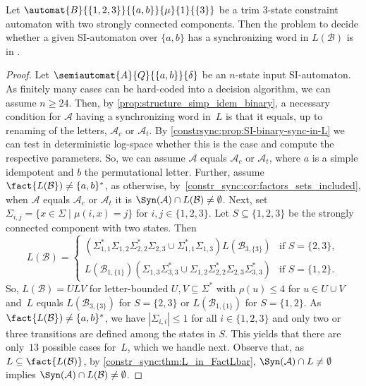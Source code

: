 \begin{lemma}\label{constrsync:input:SI:lem:threestates}
	Let $\automat{B}{\{1,2,3\}}{\{a,b\}}{\mu}{1}{\{3\}}$
	be a trim $3$-state constraint automaton
	with two strongly connected components.
	Then the problem to decide
	whether a given SI-automaton over $\{a,b\}$
	has a synchronizing word in $L(\mathcal B)$ is in \LOGSPACE.
\end{lemma}
\begin{proof}
	Let $\semiautomat{A}{Q}{\{a,b\}}{\delta}$
	be an $n$-state input SI-automaton.  
	As finitely many cases can be hard-coded into a decision algorithm, we can 
	assume $n \ge 24$.  	
	Then, by \cref{prop:structure_simp_idem_binary}, 
	a necessary condition for $\mathcal A$
	having a synchronizing word in~$L$
	is that it equals, up to renaming of the letters,
	$\mathcal A_c$
	or $\mathcal A_t$.
	By \cref{constrsync:prop:SI-binary-sync-in-L}
	we can test in deterministic log-space whether this is the case
    and compute the respective parameters.
    So, we can assume 
    $\mathcal A$ equals $\mathcal A_c$ or $\mathcal A_t$,
    where $a$ is a simple idempotent and $b$
    the permutational letter.
    Further, assume 
    $\fact{L(\mathcal B}) \ne \{a,b\}^*$,
    as otherwise, by~\cref{constr_sync:cor:factors_sets_included},
    when $\mathcal A$ equals $\mathcal A_c$
    or $\mathcal A_t$ it is $\Syn(\mathcal A) \cap L(\mathcal B) \ne \emptyset$.    
	Next, set $\Sigma_{i,j} = \{ x \in \Sigma \mid \mu(i, x) = j \}$
	for $i,j \in \{1,2,3\}$.
	Let $S \subseteq \{1,2,3\}$
	be the strongly connected component with two states.
	Then 
	\begin{equation}\label{constrsync:SI:eqn:threestates}
		L(\mathcal B) = \begin{cases}
			( \Sigma_{1,1}^* \Sigma_{1,2} \Sigma_{2,2}^* \Sigma_{2,3} \cup \Sigma_{1,1}^* \Sigma_{1,3} ) L(\mathcal B_{3,\{3\}}) & \text{if } S = \{2,3\}, \\
			L(\mathcal B_{1,\{1\}}) ( \Sigma_{1,3}\Sigma_{3,3}^* \cup \Sigma_{1,2}\Sigma_{2,2}^* \Sigma_{2,3} \Sigma_{3,3}^*) & \text{if } S = \{1,2\}.
		\end{cases}
	\end{equation}
    So, $L(\mathcal B) = ULV$ for letter-bounded $U, V \subseteq \Sigma^*$
    with $\rho(u) \le 4$ for $u \in U \cup V$
    and~$L$ equals $L(\mathcal B_{3,\{3\}})$ for $S = \{2,3\}$
    or $L(\mathcal B_{1,\{1\}})$ for $S = \{1,2\}$.    
    As $\fact{L(\mathcal B}) \ne \{a,b\}^*$, we have
    $|\Sigma_{i,i}| \le 1$ for all $i \in \{1,2,3\}$
    and only two or three transitions
    are defined among the states in $S$.
    This yields that there are only~$13$
    possible cases for~$L$, which we handle next.  
    Observe that, as $L \subseteq \fact{L(\mathcal B)}$,
    by \cref{constr_sync:thm:L_in_FactLbar},
    $\Syn(\mathcal A) \cap L \ne \emptyset$
    implies $\Syn(\mathcal A) \cap L(\mathcal B) \ne \emptyset$.     
    

\end{proof}
